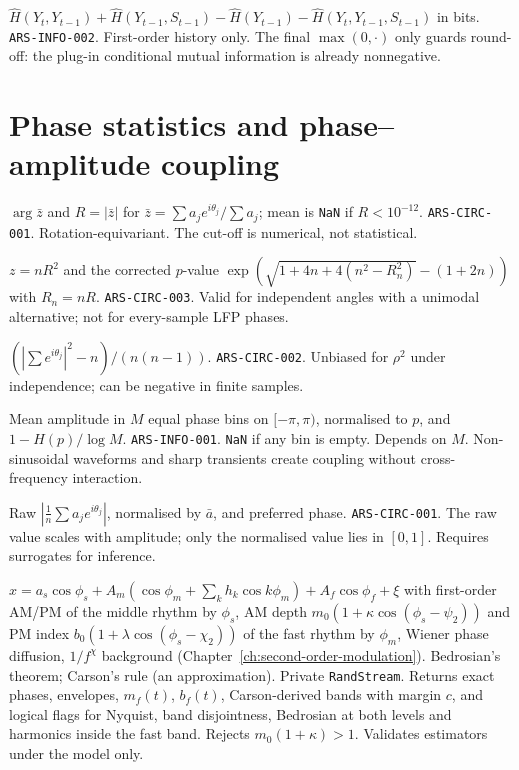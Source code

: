 {$\hat H(Y_t,Y_{t-1})+\hat H(Y_{t-1},S_{t-1})-\hat H(Y_{t-1})-\hat H(Y_t,Y_{t-1},S_{t-1})$ in bits.}
{\texttt{ARS-INFO-002}.}
{First-order history only. The final $\max(0,\cdot)$ only guards round-off: the plug-in conditional mutual information is already nonnegative.}

\section{Phase statistics and phase--amplitude coupling}
{$\arg\bar z$ and $R=|\bar z|$ for $\bar z=\sum a_je^{i\theta_j}/\sum a_j$; mean is \texttt{NaN} if $R<10^{-12}$.}
{\texttt{ARS-CIRC-001}.}
{Rotation-equivariant. The cut-off is numerical, not statistical.}

{$z=nR^2$ and the corrected $p$-value $\exp(\sqrt{1+4n+4(n^2-R_n^2)}-(1+2n))$ with $R_n=nR$.}
{\texttt{ARS-CIRC-003}.}
{Valid for independent angles with a unimodal alternative; not for every-sample LFP phases.}

{$(|\sum e^{i\theta_j}|^2-n)/(n(n-1))$.}
{\texttt{ARS-CIRC-002}.}
{Unbiased for $\rho^2$ under independence; can be negative in finite samples.}

{Mean amplitude in $M$ equal phase bins on $[-\pi,\pi)$, normalised to $p$, and $1-H(p)/\log M$.}
{\texttt{ARS-INFO-001}.}
{\texttt{NaN} if any bin is empty. Depends on $M$. Non-sinusoidal waveforms and sharp transients create coupling without cross-frequency interaction.}

{Raw $|\frac1n\sum a_je^{i\theta_j}|$, normalised by $\bar a$, and preferred phase.}
{\texttt{ARS-CIRC-001}.}
{The raw value scales with amplitude; only the normalised value lies in $[0,1]$. Requires surrogates for inference.}

{$x=a_s\cos\phi_s+A_m(\cos\phi_m+\sum_kh_k\cos k\phi_m)+A_f\cos\phi_f+\xi$ with first-order AM/PM of the middle rhythm by $\phi_s$, AM depth $m_0(1+\kappa\cos(\phi_s-\psi_2))$ and PM index $b_0(1+\lambda\cos(\phi_s-\chi_2))$ of the fast rhythm by $\phi_m$, Wiener phase diffusion, $1/f^\chi$ background (Chapter~\ref{ch:second-order-modulation}).}
{Bedrosian's theorem; Carson's rule (an approximation).}
{Private \texttt{RandStream}. Returns exact phases, envelopes, $m_f(t)$, $b_f(t)$, Carson-derived bands with margin $c$, and logical flags for Nyquist, band disjointness, Bedrosian at both levels and harmonics inside the fast band. Rejects $m_0(1+\kappa)>1$. Validates estimators under the model only.}

